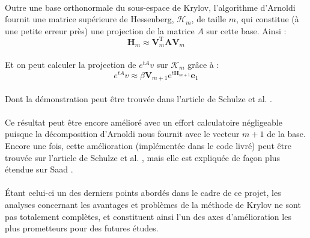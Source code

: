         \vspace{0.3cm}

        \paragraph{}
        Outre une base orthonormale du sous-espace de Krylov, l'algorithme d'Arnoldi fournit une matrice supérieure de Hessenberg, $\mathcal{H}_{m}$, de taille $m$, qui constitue (à une petite erreur près) une projection de la matrice $A$ sur cette base. Ainsi : 
        \begin{equation} 
            \mathbf{H}_{m} \approx \mathbf{V}_{m}^{\mathrm{T}} \mathbf{A} \mathbf{V}_{m}
        \end{equation}

        \paragraph{}
        Et on peut calculer la projection de $e^{tA} v$ sur $\mathcal{K}_{m}$ grâce à :
        \begin{equation} 
            e^{tA} v \approx \beta \mathbf{V}_{m+1} \mathrm{e}^{t \mathbf{H}_{m+1}} \mathbf{e}_{1}
        \end{equation}

        \paragraph{}
        Dont la démonstration peut être trouvée dans l'article de Schulze et al. \cite{Krylov:1}.

        \paragraph{}
        Ce résultat peut être encore amélioré avec un effort %
        calculatoire négligeable puisque la décomposition d'Arnoldi nous fournit avec le vecteur $m+1$ de la base. Encore une fois, cette amélioration (implémentée dans le code livré) peut être trouvée sur l'article de Schulze et al. \cite{Krylov:1}, mais elle est expliquée de façon plus étendue sur Saad \cite{Krylov:2}.

        \paragraph{}
        Étant celui-ci un des derniers points abordés dans le cadre de ce projet, les analyses concernant les avantages et problèmes de la méthode de Krylov ne sont pas totalement complètes, et constituent ainsi l'un des axes d'amélioration les plus prometteurs pour des futures études.

